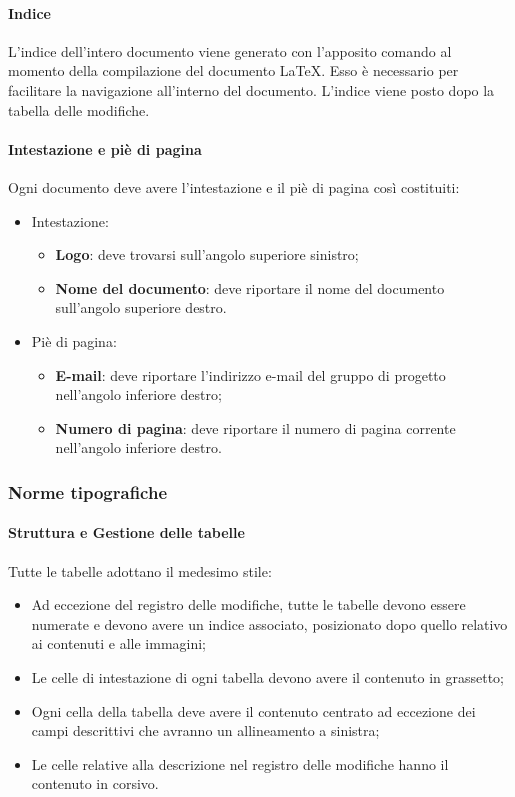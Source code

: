   \paragraph{Indice}
  L'indice dell'intero documento viene generato con l'apposito comando al momento della compilazione
  del documento \LaTeX. Esso è necessario per facilitare la navigazione all'interno del
  documento. L'indice viene posto dopo la tabella delle modifiche.

	  \paragraph{Intestazione e piè di pagina}
	Ogni documento deve avere l'intestazione e il piè di pagina così costituiti:
	\begin{itemize}
		\item Intestazione:
		\begin{itemize}
			\item \textbf{Logo}: deve trovarsi sull'angolo superiore sinistro;
			\item \textbf{Nome del documento}: deve riportare il nome del documento sull'angolo superiore destro.
		\end{itemize}
		\item Piè di pagina:
		\begin{itemize}
			\item \textbf{E-mail}: deve riportare l'indirizzo e-mail del gruppo di progetto
			nell'angolo inferiore destro;
			\item \textbf{Numero di pagina}: deve riportare il numero di pagina corrente
			nell'angolo inferiore destro.
		\end{itemize}
	\end{itemize}
	

  \subsubsection{Norme tipografiche}

  \paragraph{Struttura e Gestione delle tabelle}
  Tutte le tabelle adottano il medesimo stile:
  \begin{itemize}
  	\item Ad eccezione del registro delle modifiche, tutte le tabelle devono essere numerate e devono avere un indice associato, posizionato dopo quello relativo ai contenuti e alle immagini;
  	\item Le celle di intestazione di ogni tabella devono avere il contenuto in grassetto;
  	\item Ogni cella della tabella deve avere il contenuto centrato ad eccezione dei campi descrittivi che avranno un allineamento a sinistra;
  	\item Le celle relative alla descrizione nel registro delle modifiche hanno il contenuto in corsivo.
  \end{itemize}

